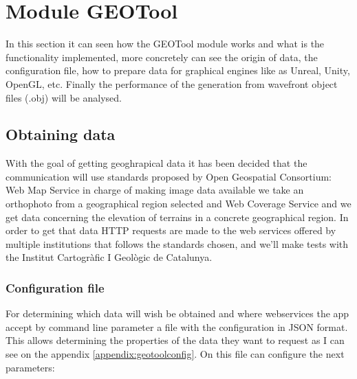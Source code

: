 \documentclass[10pt,a4paper,twocolumn,twoside]{article}
\begin{document}
\section{Module GEOTool}

In this section it can seen how the GEOTool module works and what is the functionality implemented, more concretely can see the origin of data, the configuration file, how to prepare data for graphical engines like as Unreal, Unity, OpenGL, etc. Finally the performance of the generation from wavefront object files (.obj) will be analysed.

\subsection{Obtaining data}
\label{getdata}

With the goal of getting geoghrapical data it has been decided that the communication will use standards proposed by Open Geospatial Consortium\cite{ogc}: Web Map Service\cite{wms} in charge of making image data available we take an orthophoto from a geographical region selected and Web Coverage Service\cite{wms} and we get data concerning the elevation of terrains in a concrete geographical region. In order to get that data HTTP requests are made to the web services offered by multiple institutions that follows the standards chosen, and we'll make tests with the Institut Cartogràfic I Geològic de Catalunya\cite{icgc}.

\subsubsection{Configuration file}
\label{section:configfilegeotool}
For determining which data will wish be obtained and where webservices the app accept by command line parameter a file with the configuration in JSON format. This allows determining the properties of the data they want to request as I can see on the appendix \ref{appendix:geotoolconfig}. On this file can configure the next parameters:
\end{document}
